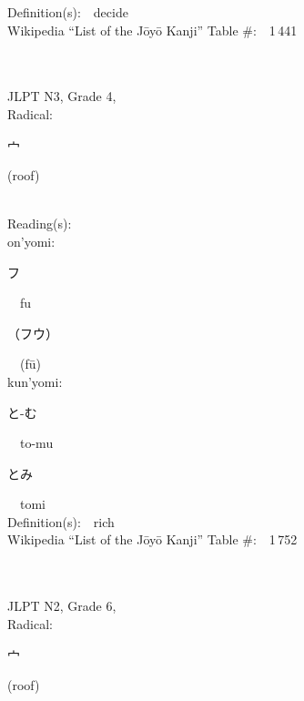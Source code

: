 \begin{multicols}{2}
Definition(s):\ \ decide \\
Wikipedia ``List of the J\=oy\=o Kanji'' Table \#:\ \ 1\,441 \\
\ \ \\
{\fontsize{34pt}{40pt}  }\ \ \\  %
{JLPT N3, Grade 4, \\Radical:\ \ {\begin{CJK}{UTF8}{min} 宀 \end{CJK}} (roof) } \\
Reading(s):\ \ \\
{\hspace*{1em}}on'yomi:\ \ \\
{\hspace*{2em}}{\begin{CJK}{UTF8}{min} フ \end{CJK}}\ \ fu\ \ \\
{\hspace*{2em}}{\begin{CJK}{UTF8}{min} （フウ） \end{CJK}}\ \ (f\=u)\ \ \\
{\hspace*{1em}}kun'yomi:\ \ \\
{\hspace*{2em}}{\begin{CJK}{UTF8}{min} と-む \end{CJK}}\ \ to-mu\ \ \\
{\hspace*{2em}}{\begin{CJK}{UTF8}{min} とみ \end{CJK}}\ \ tomi\ \ \\
Definition(s):\ \ rich \\
Wikipedia ``List of the J\=oy\=o Kanji'' Table \#:\ \ 1\,752 \\
\ \ \\
{\fontsize{34pt}{40pt}  }\ \ \\  %
{JLPT N2, Grade 6, \\Radical:\ \ {\begin{CJK}{UTF8}{min} 宀 \end{CJK}} (roof) } \\

\end{multicols}
